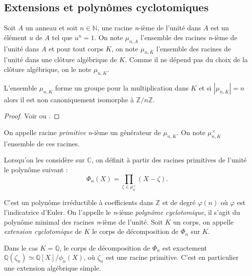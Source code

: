 \documentclass[a4paper]{article} %
\numberwithin{section}{part}
\numberwithin{equation}{section}
\newcommand\nroot[1]{\textit{#1}-ième}
\newcommand\zmodn[1]{\mathbb{Z}/#1\mathbb{Z}}
\newcommand\QQ{\mathbb{Q}}
\newcommand\ZZ{\mathbb{Z}}
\newcommand\NN{\mathbb{N}}
\newcommand\CC{\mathbb{C}}
\begin{document}
\subsection{Extensions et polynômes cyclotomiques}
Soit $A$ un anneau et soit $n\in\NN$, une racine \nroot{n} de l'unité dans $A$ 
est un élément $u$ de $A$ tel que $u^n = 1$. On note $\mu_{n,A}$ l'ensemble des 
racines \nroot{n} de l'unité dans $A$ et pour tout corps $K$, on note 
$\mu_{n,\bar{K}}$ l'ensemble des racines de l'unité dans une clôture algébrique 
de $K$. Comme il ne dépend pas du choix de la clôture algébrique, on le note 
$\mu_{n,K}$.\par

\begin{prop}
\label{prop:rootcycl}
L'ensemble $\mu_{n,K}$ forme un groupe pour la multiplication dans $K$ et si 
$|\mu_{n,K}| = n$ alors il est non canoniquement isomorphe à $\zmodn{n}$.
\end{prop}
\begin{proof}
Voir \cite[p. 28, th. 1]{Sam} ou \cite[pp. 177-178]{Lan1}.
\end{proof}

\begin{defn}
On appelle racine \emph{primitive} \nroot{n} un générateur de $\mu_{n,K}$. On 
note $\mu_{n,K}^{\times}$ l'ensemble de ces racines.
\end{defn}

Lorsqu'on les considère sur $\CC$, on définit à partir des racines primitives de
l'unité le polynôme suivant :
\begin{equation}
\Phi_n(X) = \prod_{\zeta\in \mu_n^{\times}}{(X - \zeta)}.
\end{equation}

C'est un polynôme irréductible à coefficients dans $\ZZ$ \cite[prop 4.8]{Per} et
de degré $\varphi(n)$ où $\varphi$ est l'indicatrice d'Euler. On l'appelle 
le \nroot{n} \emph{polynôme cyclotomique}, il s'agit du polynôme minimal des 
racines \nroot{n} de l'unité. Soit $K$ un corps, on appelle 
\emph{extension cyclotomique} de $K$ le corps de décomposition de $\Phi_n$ sur 
$K$.

\begin{rem}
Dans le cas $K = \QQ$, le corps de décomposition de $\Phi_n$ est exactement 
$\QQ(\zeta_n) \simeq \QQ[X]/\phi_n(X)$, où $\zeta_n$ est une racine primitive. 
C'est en particulier une extension algébrique simple.
\end{rem}
\end{document}
